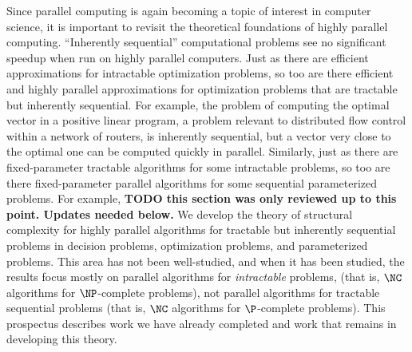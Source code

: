 \documentclass[draft]{article}
\newcommand{\todo}[1]{\textbf{TODO #1}}
\begin{document}
Since parallel computing is again becoming a topic of interest in computer science, it is important to revisit the theoretical foundations of highly parallel computing.
``Inherently sequential'' computational problems see no significant speedup when run on highly parallel computers.
Just as there are efficient approximations for intractable optimization problems, so too are there efficient and highly parallel approximations for optimization problems that are tractable but inherently sequential.
For example, the problem of computing the optimal vector in a positive linear program, a problem relevant to distributed flow control within a network of routers, is inherently sequential, but a vector very close to the optimal one can be computed quickly in parallel.
Similarly, just as there are fixed-parameter tractable algorithms for some intractable problems, so too are there fixed-parameter parallel algorithms for some sequential parameterized problems.
For example, \todo{this section was only reviewed up to this point. Updates needed below. }
We develop the theory of structural complexity for highly parallel algorithms for tractable but inherently sequential problems in decision problems, optimization problems, and parameterized problems.
This area has not been well-studied, and when it has been studied, the results focus mostly on parallel algorithms for \emph{intractable} problems, (that is, $\NC$ algorithms for $\NP$-complete problems), not parallel algorithms for tractable sequential problems (that is, $\NC$ algorithms for $\P$-complete problems).
This prospectus describes work we have already completed and work that remains in developing this theory.
\end{document}
